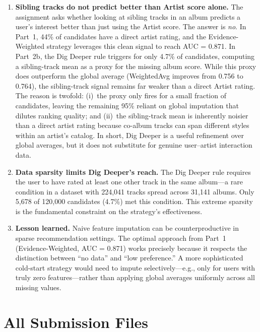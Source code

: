 \documentclass[12pt]{article}
\begin{document}
\begin{enumerate}
	\item \textbf{Sibling tracks do not predict better than Artist score alone.}
	The assignment asks whether looking at sibling tracks in an album predicts a user's interest better than just using the Artist score. The answer is \emph{no}. In Part~1, 44\% of candidates have a direct artist rating, and the Evidence-Weighted strategy leverages this clean signal to reach AUC = 0.871. In Part~2b, the Dig Deeper rule triggers for only 4.7\% of candidates, computing a sibling-track mean as a proxy for the missing album score. While this proxy does outperform the global average (WeightedAvg improves from 0.756 to 0.764), the sibling-track signal remains far weaker than a direct Artist rating. The reason is twofold: (i)~the proxy only fires for a small fraction of candidates, leaving the remaining 95\% reliant on global imputation that dilutes ranking quality; and (ii)~the sibling-track mean is inherently noisier than a direct artist rating because co-album tracks can span different styles within an artist's catalog. In short, Dig Deeper is a useful refinement over global averages, but it does not substitute for genuine user--artist interaction data.

	\item \textbf{Data sparsity limits Dig Deeper's reach.}
	The Dig Deeper rule requires the user to have rated at least one other track in the same album---a rare condition in a dataset with 224,041 tracks spread across 31,141 albums. Only 5,678 of 120,000 candidates (4.7\%) met this condition. This extreme sparsity is the fundamental constraint on the strategy's effectiveness.

	\item \textbf{Lesson learned.}
	Naive feature imputation can be counterproductive in sparse recommendation settings. The optimal approach from Part~1 (Evidence-Weighted, AUC = 0.871) works precisely because it respects the distinction between ``no data'' and ``low preference.'' A more sophisticated cold-start strategy would need to impute selectively---e.g., only for users with truly zero features---rather than applying global averages uniformly across all missing values.
\end{enumerate}

\newpage
\section{All Submission Files}
\end{document}
